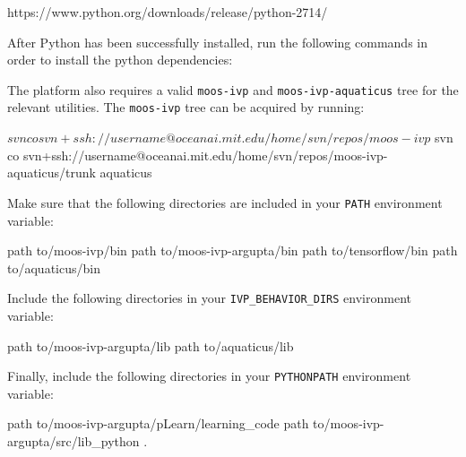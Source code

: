 \documentclass[onecolumn,letterpaper,11pt]{article}
\begin{document}
\vspace{0.15in}
https://www.python.org/downloads/release/python-2714/
\vspace{0.15in}

After Python has been successfully installed, run the following commands in order to install the python dependencies:

\vspace{0.15in}
\vspace{0.15in}

The platform also requires a valid \texttt{moos-ivp} and \texttt{moos-ivp-aquaticus} tree for the relevant utilities. The \texttt{moos-ivp} tree can be acquired by running:

\vspace{0.15in}
\begin{fileverb} 
$ svn co svn+ssh://{username}@oceanai.mit.edu/home/svn/repos/moos-ivp
$ svn co svn+ssh://{username}@oceanai.mit.edu/home/svn/repos/moos-ivp-aquaticus/trunk aquaticus
\end{fileverb}
\vspace{0.15in}

Make sure that the following directories are included in your \texttt{PATH} environment variable: 

\vspace{0.15in}
\begin{fileverb}
{path to}/moos-ivp/bin
{path to}/moos-ivp-argupta/bin
{path to}/tensorflow/bin
{path to}/aquaticus/bin
\end{fileverb}
\vspace{0.15in}
	
Include the following directories in your \texttt{IVP\_BEHAVIOR\_DIRS} environment variable: 

\vspace{0.15in}
\begin{fileverb}
{path to}/moos-ivp-argupta/lib
{path to}/aquaticus/lib
\end{fileverb}
\vspace{0.15in}

Finally, include the following directories in your \texttt{PYTHONPATH} environment variable: 

\vspace{0.15in}
\begin{fileverb}
{path to}/moos-ivp-argupta/pLearn/learning_code
{path to}/moos-ivp-argupta/src/lib_python
.
\end{fileverb}
\vspace{0.15in}
\end{document}
